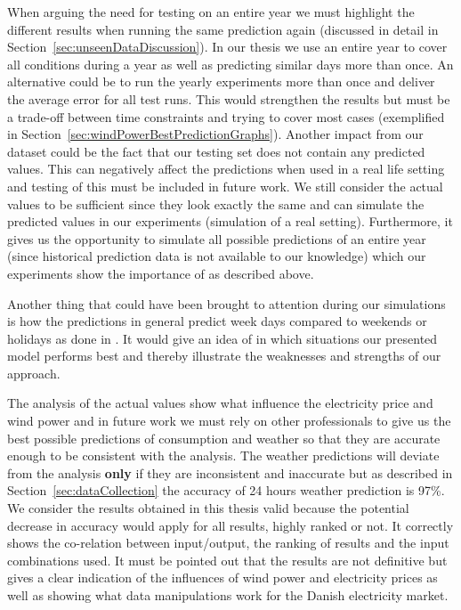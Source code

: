 When arguing the need for testing on an entire year we must highlight the different results when running the same prediction again (discussed in detail in Section~\ref{sec:unseenDataDiscussion}). In our thesis we use an entire year to cover all conditions during a year as well as predicting similar days more than once. An alternative could be to run the yearly experiments more than once and deliver the average error for all test runs. This would strengthen the results but must be a trade-off between time constraints and trying to cover most cases (exemplified in Section~\ref{sec:windPowerBestPredictionGraphs}). Another impact from our dataset could be the fact that our testing set does not contain any predicted values. This can negatively affect the predictions when used in a real life setting and testing of this must be included in future work. We still consider the actual values to be sufficient since they look exactly the same and can simulate the predicted values in our experiments (simulation of a real setting). Furthermore, it gives us the opportunity to simulate all possible predictions of an entire year (since historical prediction data is not available to our knowledge) which our experiments show the importance of as described above.

Another thing that could have been brought to attention during our simulations is how the predictions in general predict week days compared to weekends or holidays as done in \cite{forecastingSpotPricesAccountingForWindPower}. It would give an idea of in which situations our presented model performs best and thereby illustrate the weaknesses and strengths of our approach.

The analysis of the actual values show what influence the electricity price and wind power and in future work we must rely on other professionals to give us the best possible predictions of consumption and weather so that they are accurate enough to be consistent with the analysis. The weather predictions will deviate from the analysis \textbf{only} if they are inconsistent and inaccurate but as described in Section~\ref{sec:dataCollection} the accuracy of 24 hours weather prediction is 97\%. We consider the results obtained in this thesis valid because the potential decrease in accuracy would apply for all results, highly ranked or not. It correctly shows the co-relation between input/output, the ranking of results and the input combinations used. It must be pointed out that the results are not definitive but gives a clear indication of the influences of wind power and electricity prices as well as showing what data manipulations work for the Danish electricity market. 

